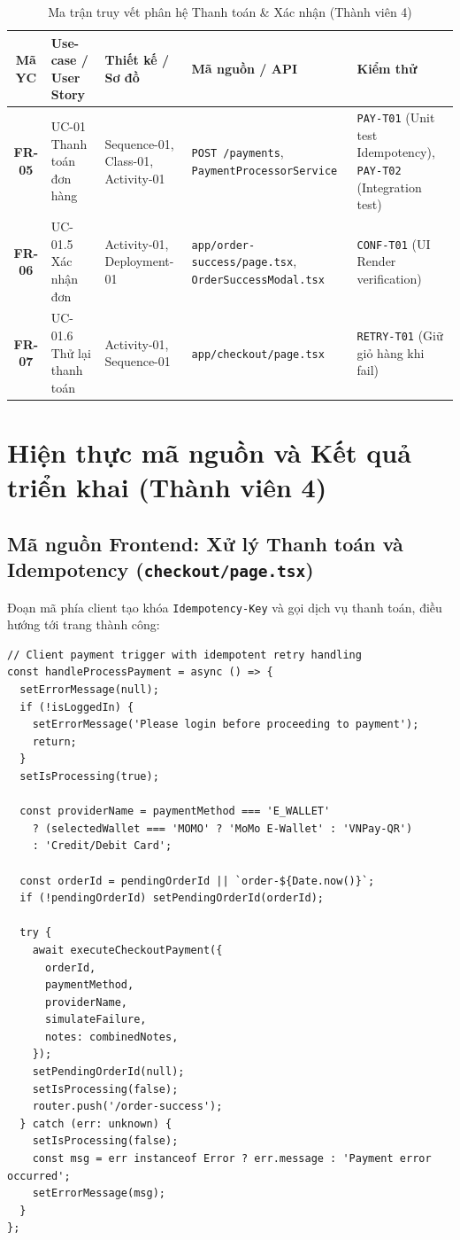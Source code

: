 \documentclass[a4paper]{article}
\begin{document}
\begin{table}[h!]
\centering
\small
\begin{tabular}{|c|l|l|l|l|}
\hline
\textbf{Mã YC} & \textbf{Use-case / User Story} & \textbf{Thiết kế / Sơ đồ} & \textbf{Mã nguồn / API} & \textbf{Kiểm thử} \\ \hline
\textbf{FR-05} & UC-01 Thanh toán đơn hàng & Sequence-01, Class-01, Activity-01 & \texttt{POST /payments}, \newline \texttt{PaymentProcessorService} & \texttt{PAY-T01} (Unit test Idempotency), \newline \texttt{PAY-T02} (Integration test) \\ \hline
\textbf{FR-06} & UC-01.5 Xác nhận đơn & Activity-01, Deployment-01 & \texttt{app/order-success/page.tsx}, \newline \texttt{OrderSuccessModal.tsx} & \texttt{CONF-T01} (UI Render verification) \\ \hline
\textbf{FR-07} & UC-01.6 Thử lại thanh toán & Activity-01, Sequence-01 & \texttt{app/checkout/page.tsx} & \texttt{RETRY-T01} (Giữ giỏ hàng khi fail) \\ \hline
\end{tabular}
\caption{Ma trận truy vết phân hệ Thanh toán \& Xác nhận (Thành viên 4)}
\end{table}

\section{Hiện thực mã nguồn và Kết quả triển khai (Thành viên 4)}

\subsection{Mã nguồn Frontend: Xử lý Thanh toán và Idempotency (\texttt{checkout/page.tsx})}
Đoạn mã phía client tạo khóa \texttt{Idempotency-Key} và gọi dịch vụ thanh toán, điều hướng tới trang thành công:

\begin{lstlisting}[caption={Client Checkout Payment Handler with Idempotency Key}]
// Client payment trigger with idempotent retry handling
const handleProcessPayment = async () => {
  setErrorMessage(null);
  if (!isLoggedIn) {
    setErrorMessage('Please login before proceeding to payment');
    return;
  }
  setIsProcessing(true);
  
  const providerName = paymentMethod === 'E_WALLET' 
    ? (selectedWallet === 'MOMO' ? 'MoMo E-Wallet' : 'VNPay-QR')
    : 'Credit/Debit Card';

  const orderId = pendingOrderId || `order-${Date.now()}`;
  if (!pendingOrderId) setPendingOrderId(orderId);

  try {
    await executeCheckoutPayment({
      orderId,
      paymentMethod,
      providerName,
      simulateFailure,
      notes: combinedNotes,
    });
    setPendingOrderId(null);
    setIsProcessing(false);
    router.push('/order-success');
  } catch (err: unknown) {
    setIsProcessing(false);
    const msg = err instanceof Error ? err.message : 'Payment error occurred';
    setErrorMessage(msg);
  }
};
\end{lstlisting}
\end{document}

